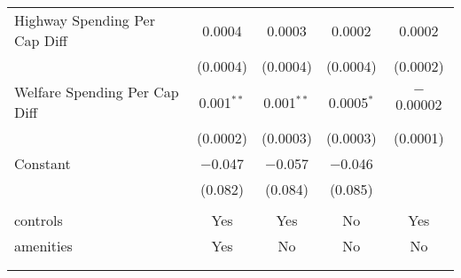 \begin{table}[!htbp]
\begin{tabular}{@{\extracolsep{5pt}}lcccc}
  Highway Spending Per Cap Diff & 0.0004 & 0.0003 & 0.0002 & 0.0002 \\ 
  & (0.0004) & (0.0004) & (0.0004) & (0.0002) \\ 
  Welfare Spending Per Cap Diff & 0.001$^{**}$ & 0.001$^{**}$ & 0.0005$^{*}$ & $-$0.00002 \\ 
  & (0.0002) & (0.0003) & (0.0003) & (0.0001) \\ 
  Constant & $-$0.047 & $-$0.057 & $-$0.046 &  \\ 
  & (0.082) & (0.084) & (0.085) &  \\ 
 \hline \\[-1.8ex] 
controls & Yes & Yes & No & Yes \\ 
amenities & Yes & No & No & No \\ 
\hline \\[-1.8ex] 
\hline 
\hline \\[-1.8ex] 
\end{tabular} 
\end{table} 
